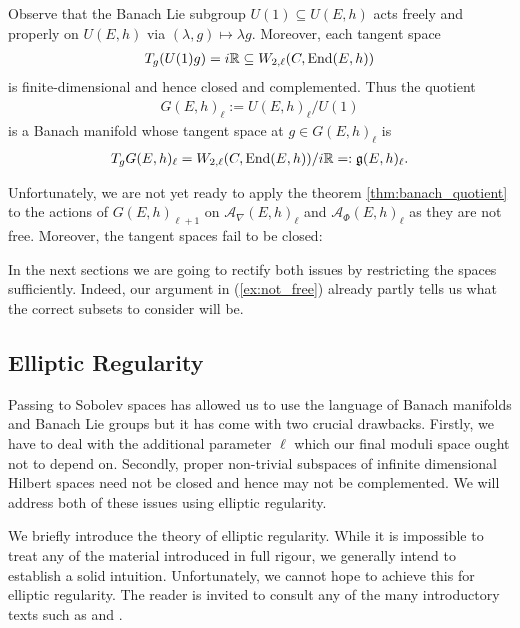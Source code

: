 \documentclass[12pt]{ociamthesis}  %
\begin{document}
\begin{example}
  Observe that the Banach Lie subgroup $U(1)\subseteq U(E,h)$ acts freely and properly
  on $U(E,h)$ via $(\lambda,g)\mapsto \lambda g$. Moreover, each tangent space
  \begin{align*}
    T_g(U(1)g) =
    i\mathbb{R} \subseteq W_{2,\ell}(C,\operatorname{End}(E,h))
  \end{align*}
  is finite-dimensional and hence closed and complemented.  Thus the quotient
  \begin{align*}
    G(E,h)_{\ell} := U(E,h)_\ell / U(1)
  \end{align*}
  is a Banach manifold whose tangent space at $g\in G(E,h)_\ell$ is
  \begin{align*}
    T_g G(E,h)_\ell =  W_{2,\ell}(C,\operatorname{End}(E,h))/i\mathbb{R} =: \mathfrak g(E,h)_\ell.
  \end{align*}
\end{example}

Unfortunately, we are not yet ready to apply the theorem \ref{thm:banach_quotient} to
the actions of $G(E,h)_{\ell+1}$ on $\mathcal A_\nabla(E,h)_\ell$ and
$\mathcal A_\Phi(E,h)_\ell$ as they are not free. Moreover, the tangent spaces fail to
be closed:

\begin{example}
  \missingexample
\end{example}

In the next sections we are going to rectify both issues by restricting the spaces
sufficiently. Indeed, our argument in (\ref{ex:not_free}) already partly tells us
what the correct subsets to consider will be.

\subsection{Elliptic Regularity}\label{sec:elliptic_regularity}

Passing to Sobolev spaces has allowed us to use the language of
Banach manifolds and Banach Lie groups but it has come with two
crucial drawbacks. Firstly, we have to deal with the additional
parameter $\ell$ which our final moduli space ought not to depend on.
Secondly, proper non-trivial subspaces of infinite dimensional Hilbert
spaces need not be closed and hence may not be complemented.
We will address both of these issues using elliptic regularity.

We briefly introduce the theory of elliptic regularity. While it is
impossible to treat any of the material introduced in full rigour,
we generally intend to establish a solid intuition. Unfortunately, we
cannot hope to achieve this for elliptic regularity. The reader is
invited to consult any of the many introductory texts such
as \cite{hance2014} and \cite[Chapter 6]{warner1983}. 
\end{document}
